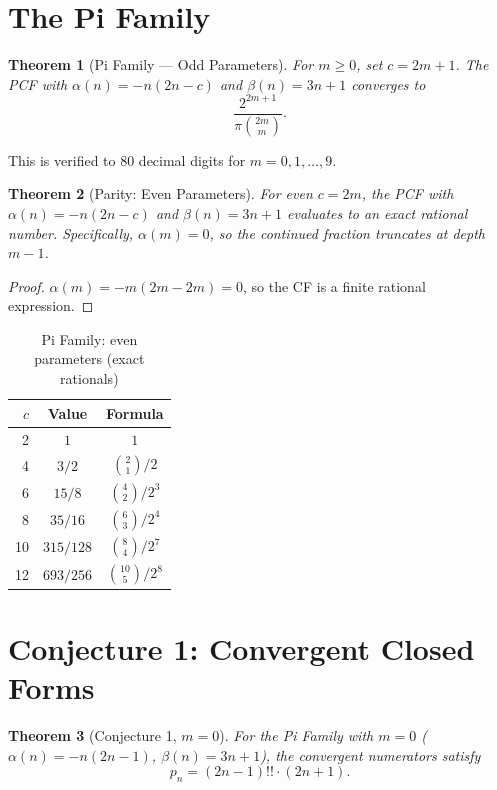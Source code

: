 \documentclass[11pt,a4paper]{article}
\newtheorem{theorem}{Theorem}
\theoremstyle{definition}
\theoremstyle{remark}
\begin{document}
\section{The Pi Family}\label{sec:pi}

\begin{theorem}[Pi Family --- Odd Parameters]\label{thm:pi}
For $m \ge 0$, set $c = 2m{+}1$. The PCF with $\alpha(n) = -n(2n - c)$
and $\beta(n) = 3n+1$ converges to
\[
  \frac{2^{2m+1}}{\pi \binom{2m}{m}}.
\]
\end{theorem}

This is verified to 80 decimal digits for $m = 0, 1, \ldots, 9$.

\begin{theorem}[Parity: Even Parameters]\label{thm:parity}
For even $c = 2m$, the PCF with $\alpha(n) = -n(2n-c)$ and $\beta(n) = 3n+1$
evaluates to an exact rational number. Specifically, $\alpha(m) = 0$,
so the continued fraction truncates at depth $m{-}1$.
\end{theorem}

\begin{proof}
$\alpha(m) = -m(2m - 2m) = 0$, so the CF is a finite rational expression.
\end{proof}

\begin{table}[h]
\centering
\caption{Pi Family: even parameters (exact rationals)}
\begin{tabular}{rcc}
\toprule
$c$ & Value & Formula \\
\midrule
2 & $1$ & $1$ \\
4 & $3/2$ & $\binom{2}{1}/2$ \\
6 & $15/8$ & $\binom{4}{2}/2^3$ \\
8 & $35/16$ & $\binom{6}{3}/2^4$ \\
10 & $315/128$ & $\binom{8}{4}/2^7$ \\
12 & $693/256$ & $\binom{10}{5}/2^8$ \\
\bottomrule
\end{tabular}
\end{table}

\section{Conjecture 1: Convergent Closed Forms}

\begin{theorem}[Conjecture 1, $m=0$]\label{thm:conj1m0}
For the Pi Family with $m=0$ ($\alpha(n) = -n(2n{-}1)$, $\beta(n) = 3n{+}1$),
the convergent numerators satisfy
\[
  p_n = (2n{-}1)!! \cdot (2n{+}1).
\]
\end{theorem}
\end{document}
